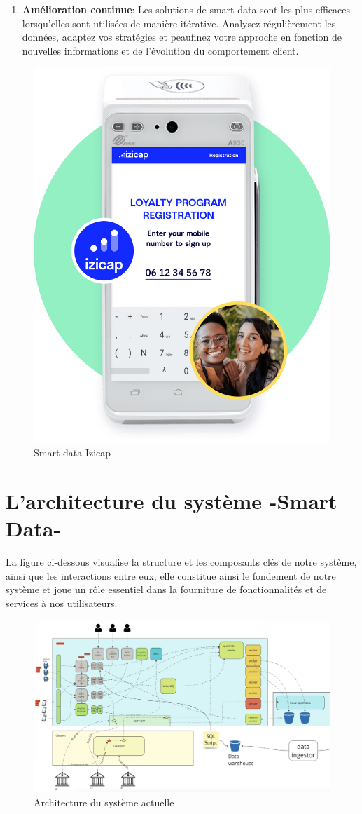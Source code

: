 \begin{enumerate}
    \item \textbf{Amélioration continue}: Les solutions de smart data sont les plus efficaces lorsqu'elles sont utilisées de manière itérative. Analysez régulièrement les données, adaptez vos stratégies et peaufinez votre approche en fonction de nouvelles informations et de l'évolution du comportement client.
\end{enumerate}


\begin{figure}[H]
\centering
\includegraphics[width=0.6\linewidth]{images/smart-data-izicap.png}
\caption{Smart data Izicap}\label{fig:smart-data-Izicap}
\end{figure}


\section{L'architecture du système -Smart Data-}

La figure ci-dessous visualise la structure et les composants clés de notre système, ainsi que les interactions entre eux, elle constitue ainsi le fondement de notre système et joue un rôle essentiel dans la fourniture de fonctionnalités et de services à nos utilisateurs.

\begin{figure}[H]
\centering
\includegraphics[width=\linewidth]{images/archi-globale.png}
\caption{Architecture du système actuelle}\label{fig:architecture-monolithique}
\end{figure}

